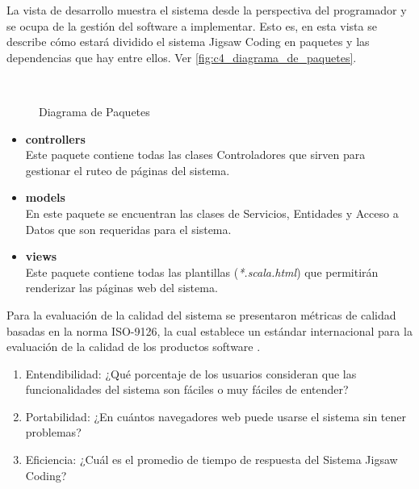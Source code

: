 \documentclass[twoside]{article}
\begin{document}
\begin{multicols}{2}
La vista de desarrollo muestra el sistema desde la perspectiva del programador y se ocupa de la gestión del software a implementar. Esto es, en esta vista se describe cómo estará dividido el sistema Jigsaw Coding en paquetes y las dependencias que hay entre ellos. Ver \autoref{fig:c4_diagrama_de_paquetes}.
\begin{figure}[H]
	\centering
	\\
	\caption{Diagrama de Paquetes}\label{fig:c4_diagrama_de_paquetes}
\end{figure}
\begin{itemize}
	\item \textbf{controllers}\\Este paquete contiene todas las clases Controladores que sirven para gestionar el ruteo de páginas del sistema.
	\item \textbf{models}\\En este paquete se encuentran las clases de Servicios, Entidades y Acceso a Datos que son requeridas para el sistema.
	\item \textbf{views}\\Este paquete contiene todas las plantillas (\emph{*.scala.html}) que permitirán renderizar las páginas web del sistema.
\end{itemize}

Para la evaluación de la calidad del sistema se presentaron métricas de calidad basadas en la norma ISO-9126, la cual establece un estándar internacional para la evaluación de la calidad de los productos software \cite{iso9126-3}.

\begin{enumerate}
	\item Entendibilidad: ¿Qué porcentaje de los usuarios consideran que las funcionalidades del sistema son fáciles o muy fáciles de entender? \\ 
	\item Portabilidad: ¿En cuántos navegadores web puede usarse el sistema sin tener problemas?  \\ 
	\item Eficiencia: ¿Cuál es el promedio de tiempo de respuesta del Sistema Jigsaw Coding?\\
\end{enumerate}


\end{multicols}
\end{document}
